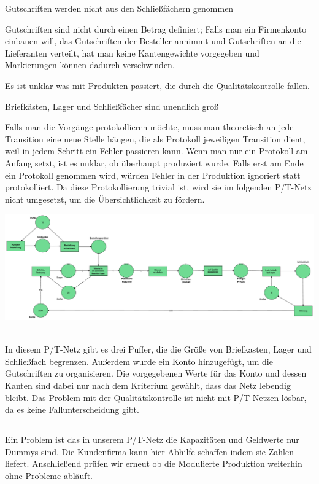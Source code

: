 \documentclass[12pt,a4paper]{../krautsourcing/homework}
\begin{document}
\begin{compactitem}
\item
Gutschriften werden nicht aus den Schließfächern genommen
\item
Gutschriften sind nicht durch einen Betrag definiert; Falls man ein Firmenkonto einbauen will, das Gutschriften der Besteller annimmt und Gutschriften an die Lieferanten verteilt, hat man keine Kantengewichte vorgegeben und Markierungen können dadurch verschwinden.
\item
Es ist unklar was mit Produkten passiert, die durch die Qualitätskontrolle fallen.
\item
Briefkästen, Lager und Schließfächer sind unendlich groß
\end{compactitem}
Falls man die Vorgänge protokollieren möchte, muss man theoretisch an jede Transition eine neue Stelle hängen, die als Protokoll jeweiligen Transition dient, weil in jedem Schritt ein Fehler passieren kann. Wenn man nur ein Protokoll am Anfang setzt, ist es unklar, ob überhaupt produziert wurde. Falls erst am Ende ein Protokoll genommen wird, würden Fehler in der Produktion ignoriert statt protokolliert. Da diese Protokollierung trivial ist, wird sie im folgenden P/T-Netz nicht umgesetzt, um die Übersichtlichkeit zu fördern.\\
\centerline{
\includegraphics[scale=0.28,trim={0mm 0mm 0mm 0mm},clip]{Aufgabe_7-5/Aufgabe_7-5-6.pdf}
}\\
In diesem P/T-Netz gibt es drei Puffer, die die Größe von Briefkasten, Lager und Schließfach begrenzen. Außerdem wurde ein Konto hinzugefügt, um die Gutschriften zu organisieren. Die vorgegebenen Werte für das Konto und dessen Kanten sind dabei nur nach dem Kriterium gewählt, dass das Netz lebendig bleibt. Das Problem mit der Qualitätskontrolle ist nicht mit P/T-Netzen lösbar, da es keine Fallunterscheidung gibt.
\subsection{}

Ein Problem ist das in unserem P/T-Netz die Kapazitäten und Geldwerte nur Dummys sind. Die Kundenfirma kann hier Abhilfe schaffen indem sie Zahlen liefert. Anschließend prüfen wir erneut ob die Modulierte Produktion weiterhin ohne Probleme abläuft.
\end{document}
